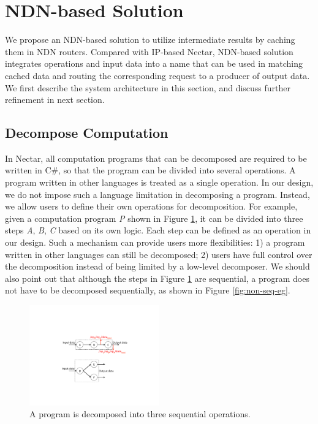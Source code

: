 \section{NDN-based Solution}
We propose an NDN-based solution to utilize intermediate results by caching them in NDN routers.  
Compared with IP-based Nectar, NDN-based solution integrates operations and input data into a name that can be used in matching
cached data and routing the corresponding request to a producer of output data.
We first describe the system architecture in this section, and discuss further
refinement in next section.

\subsection{Decompose Computation}
In Nectar, all computation programs that can be decomposed are required to be
written in C\#, so that the program can be divided into several operations.  A
program written in other languages is treated as a single operation.  In our
design, we do not impose such a language limitation in decomposing a program.
Instead, we allow users to define their own operations for decomposition.  For
example, given a computation program {\it P} shown in Figure \ref{fig:seq-eg},
it can be divided into three steps {\it A}, {\it B}, {\it C} based on its own
logic.  Each step can be defined as an operation in our design.  Such a
mechanism can provide users more flexibilities: 1) a program written in other
languages can still be decomposed; 2) users have full control over the
decomposition instead of being limited by a low-level decomposer.  We should
also point out that although the steps in Figure \ref{fig:seq-eg} are
sequential, a program does not have to be decomposed sequentially, as shown in
Figure \ref{fig:non-seq-eg}.

\begin{figure}
\begin{center}
\includegraphics[width=0.5\textwidth]{fig-p-r/seq-eg.pdf}
\end{center}
\caption{A program is decomposed into three sequential operations.}
\label{fig:seq-eg}
\end{figure}

